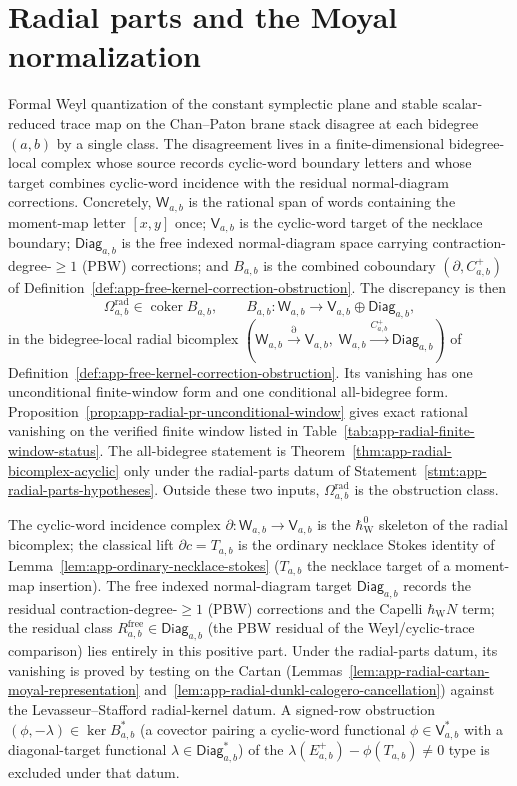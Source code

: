 \section{Radial parts and the Moyal normalization}
\label{sec:app-radial-parts-moyal}

Formal Weyl quantization of the constant symplectic plane and stable
scalar-reduced trace map on the Chan--Paton brane stack disagree
at each bidegree \((a,b)\) by a single class.  The disagreement lives
in a finite-dimensional bidegree-local complex whose source records
cyclic-word boundary letters and whose target combines cyclic-word
incidence with the residual normal-diagram corrections.  Concretely,
\(\mathsf W_{a,b}\) is the rational span of words containing the
moment-map letter \([x,y]\) once;
\(\mathsf V_{a,b}\) is the cyclic-word target of the necklace
boundary; \(\mathsf{Diag}_{a,b}\) is the free indexed normal-diagram
space carrying contraction-degree-\(\geq1\) (PBW) corrections; and
\(B_{a,b}\) is the combined coboundary
\((\partial,C^+_{a,b})\) of
Definition~\ref{def:app-free-kernel-correction-obstruction}.  The
discrepancy is then
\[
  \Omega^{\mathrm{rad}}_{a,b}
    \in
  \operatorname{coker}B_{a,b},
  \qquad
  B_{a,b}\colon\mathsf W_{a,b}
    \longrightarrow
  \mathsf V_{a,b}\oplus\mathsf{Diag}_{a,b},
\]
in the bidegree-local radial bicomplex
\((\mathsf W_{a,b}\xrightarrow{\partial}\mathsf V_{a,b},\;
   \mathsf W_{a,b}\xrightarrow{C^+_{a,b}}\mathsf{Diag}_{a,b})\)
of Definition~\ref{def:app-free-kernel-correction-obstruction}.  Its
vanishing has one unconditional finite-window form and one conditional
all-bidegree form.  Proposition~\ref{prop:app-radial-pr-unconditional-window}
gives exact rational vanishing on the verified finite window listed in
Table~\ref{tab:app-radial-finite-window-status}.  The all-bidegree
statement is Theorem~\ref{thm:app-radial-bicomplex-acyclic} only under
the radial-parts datum of
Statement~\ref{stmt:app-radial-parts-hypotheses}.  Outside these two
inputs, \(\Omega^{\mathrm{rad}}_{a,b}\) is the obstruction class.

The cyclic-word incidence complex
\(\partial:\mathsf W_{a,b}\to\mathsf V_{a,b}\) is the \(\hbar_{\mathrm{W}}^0\)
skeleton of the radial bicomplex; the classical lift
\(\partial c=T_{a,b}\) is the ordinary necklace Stokes identity of
Lemma~\ref{lem:app-ordinary-necklace-stokes} (\(T_{a,b}\) the necklace
target of a moment-map insertion).  The free indexed
normal-diagram target \(\mathsf{Diag}_{a,b}\) records the residual
contraction-degree-\(\geq1\) (PBW) corrections and the Capelli
\(\hbar_{\mathrm{W}} N\) term; the residual class
\(R^{\mathrm{free}}_{a,b}\in\mathsf{Diag}_{a,b}\) (the PBW residual
of the Weyl/cyclic-trace comparison) lies entirely in this positive
part.  Under the radial-parts datum, its vanishing is proved by testing
on the Cartan
(Lemmas~\ref{lem:app-radial-cartan-moyal-representation}
and~\ref{lem:app-radial-dunkl-calogero-cancellation}) against the
Levasseur--Stafford radial-kernel datum.  A signed-row obstruction
\((\phi,-\lambda)\in\ker B_{a,b}^*\) (a covector pairing a
cyclic-word functional \(\phi\in\mathsf V_{a,b}^*\) with a
diagonal-target functional \(\lambda\in\mathsf{Diag}_{a,b}^*\)) of the
\(\lambda(E^+_{a,b})-\phi(T_{a,b})\neq0\) type is excluded under that
datum.

